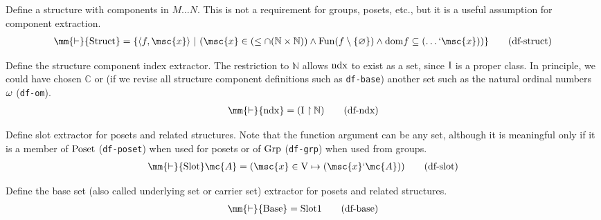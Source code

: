 \begin{metadefinition} Define a structure with components in
$M \ldots N$.  This is not a
       requirement for groups, posets, etc., but it is a useful assumption for
       component extraction.
\begin{align}
\mm{\vdash} {\rm Struct} = \{ \langle f , \msc{x} \rangle ~\vert~ ( \msc{x} \in
    ( \le \cap ( \mathbb{N} \times \mathbb{N} ) ) \wedge {\rm Fun} ( f
    \setminus \{ \varnothing \} ) \wedge {\rm dom} f \subseteq ( \ldots `
    \msc{x} ) ) \}\label{eq:df-struct}\tag{df-struct}
\end{align}
\end{metadefinition}


\begin{metadefinition} Define the structure component index
extractor.  
     The restriction to $\mathbb{N}$ allows ${\rm
ndx}$ to exist
     as a set, since ${\rm I}$ is a proper class.  In principle, we could have
     chosen $\mathbb{C}$ or (if we revise all structure component definitions
such as
     {\tt df-base}) another set such as the natural ordinal numbers ${\rm
\omega}$
     ({\tt df-om}).  %
\begin{align}
\mm{\vdash} {\rm ndx} = ( {\rm I} \restriction \mathbb{N}
    )\label{eq:df-ndx}\tag{df-ndx}
\end{align}
\end{metadefinition}


\begin{metadefinition} Define slot extractor for posets and
related structures.  Note that the
       function argument can be any set, although it is meaningful only if it
       is a member of ${\rm Poset}$ ({\tt df-poset}) when used for posets or
of
       ${\rm Grp}$ ({\tt df-grp}) when used from groups.  
\begin{align}
\mm{\vdash} {\rm Slot} \mc{A} = ( \msc{x} \in {\rm V} \mapsto ( \msc{x} `
    \mc{A} ) )\label{eq:df-slot}\tag{df-slot}
\end{align}
\end{metadefinition}


\begin{metadefinition} Define the base set (also called
underlying set or carrier set) extractor
     for posets and related structures.  
\begin{align}
\mm{\vdash} {\rm Base} = {\rm Slot} 1\label{eq:df-base}\tag{df-base}
\end{align}
\end{metadefinition}


